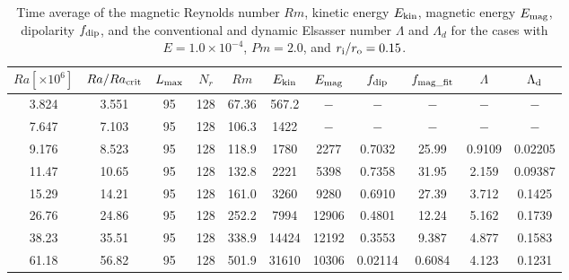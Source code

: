 %
\begin{table}
{\color{red}
\caption{Time average of the magnetic Reynolds number $Rm$, kinetic energy $E_{\rm kin}$, magnetic energy $E_{\rm mag}$, dipolarity $f_{\rm dip}$, and  the conventional and dynamic Elsasser number $\Lambda$ and $\Lambda_{d}$ for the cases with $E = 1.0 \times 10^{-4}$, $Pm = 2.0$, and $r_{\rm i}/r_{\rm o} = 0.15$.}
}
{\color{red}
  \begin{tabular}{ccccccccccc}
    \hline
     $Ra[\times 10^6]$  &  $Ra/Ra_{\rm crit}$& 
     $L_{\rm max}$ & $N_{r}$ & $Rm$ 
     & $E_{\rm kin}$  &  $E_{\rm mag}$ & $f_{\rm dip}$ & $f_{\rm mag\_fit}$ & $\Lambda$ & $\Lambda_{\rm d}$\\
    \hline
      3.824 & 3.551 & 95 & 128 & 67.36 & 567.2 & $-$ & $-$ & $-$ & $-$ & $-$ \\
      7.647 & 7.103 & 95 & 128 & 106.3 & 1422 & $-$ & $-$ & $-$ & $-$ & $-$ \\
      9.176 & 8.523 & 95 & 128 & 118.9 & 1780 & 2277 & 0.7032 & 25.99 & 0.9109 & 0.02205 \\
      11.47 & 10.65 & 95 & 128 & 132.8 & 2221 & 5398 & 0.7358 & 31.95 & 2.159 & 0.09387 \\
      15.29 & 14.21 & 95 & 128 & 161.0 & 3260 & 9280 & 0.6910 & 27.39 & 3.712 & 0.1425 \\
      26.76 & 24.86 & 95 & 128 & 252.2 & 7994 & 12906 & 0.4801 & 12.24 & 5.162 & 0.1739 \\
      38.23 & 35.51 & 95 & 128 & 338.9 & 14424 & 12192 & 0.3553 & 9.387 & 4.877 & 0.1583 \\
      61.18 & 56.82 & 95 & 128 & 501.9 & 31610 & 10306 & 0.02114 & 0.6084 & 4.123 & 0.1231 \\
   \hline
  \end{tabular}
 }
\label{table:Summary_415}
\end{table}
%
%
%
%
